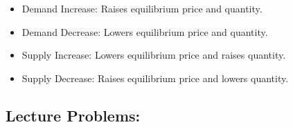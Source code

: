 \documentclass[
]{book}
\providecommand{\tightlist}{%
  \setlength{\itemsep}{0pt}\setlength{\parskip}{0pt}}
\begin{document}
\begin{enumerate}
\begin{itemize}
    \begin{itemize}
    \tightlist
    \item
      Demand Increase: Raises equilibrium price and quantity.
    \item
      Demand Decrease: Lowers equilibrium price and quantity.
    \item
      Supply Increase: Lowers equilibrium price and raises quantity.
    \item
      Supply Decrease: Raises equilibrium price and lowers quantity.
    \end{itemize}
  \end{itemize}
\end{enumerate}

\subsection*{Lecture Problems:}\label{lecture-problems-2}
\end{document}
